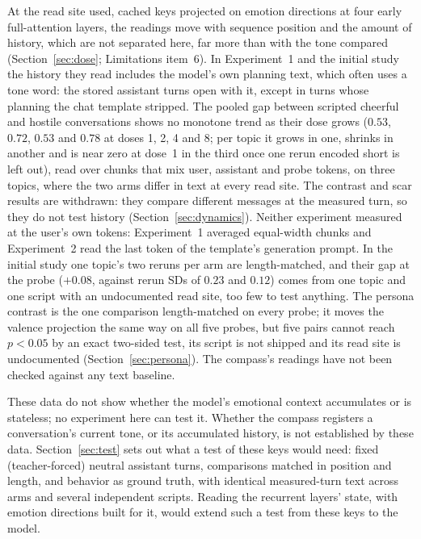 \documentclass[11pt,a4paper]{article}
\begin{document}
At the read site used, cached keys projected on emotion directions at
four early full-attention layers, the readings move with sequence
position and the amount of history, which are not separated here, far
more than with the tone compared (Section~\ref{sec:dose}; Limitations
item~6). In Experiment~1 and the initial study the history they read
includes the model's own planning text, which often uses a tone word:
the stored assistant turns open with it, except in turns whose planning
the chat template stripped. The pooled gap between
scripted cheerful and hostile conversations shows no monotone trend as
their dose grows ($0.53$, $0.72$, $0.53$ and $0.78$ at doses 1, 2, 4 and
8; per topic it grows in one, shrinks in another and is near zero at
dose~1 in the third once one rerun encoded short is left out), read over
chunks that mix user, assistant and probe tokens, on three topics, where
the two arms differ in text at every read site. The contrast and scar
results are withdrawn: they compare different messages at the measured turn, so they do not
test history (Section~\ref{sec:dynamics}). Neither experiment measured
at the user's own tokens: Experiment~1 averaged equal-width chunks and
Experiment~2 read the last token of the template's generation prompt.
In the initial study one topic's two reruns per arm are length-matched,
and their gap at the probe ($+0.08$, against rerun SDs of $0.23$ and
$0.12$) comes from one topic and one script with an undocumented read
site, too few to test anything. The persona contrast is the one comparison length-matched on every
probe; it moves the valence projection the same way on all five probes,
but five pairs cannot reach $p{<}0.05$ by an exact two-sided test, its
script is not shipped and its read site is undocumented
(Section~\ref{sec:persona}). The compass's readings have not been
checked against any text baseline.

These data do not show whether the model's emotional context accumulates
or is stateless; no experiment here can test it. Whether the compass registers a conversation's current
tone, or its accumulated history, is not established by these data.
Section~\ref{sec:test} sets out what a test of these keys would need: fixed
(teacher-forced) neutral assistant turns, comparisons matched in
position and length, and behavior as ground truth, with identical
measured-turn text across arms and several independent scripts.
Reading the recurrent layers' state, with emotion directions built for
it, would extend such a test from these keys to the model.
\end{document}
